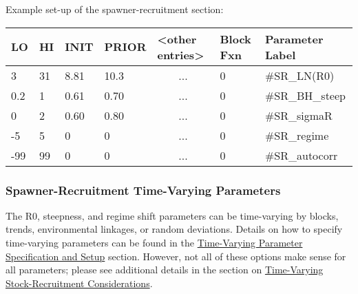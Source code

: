 Example set-up of the spawner-recruitment section:
\begin{center}
	\begin{longtable}{p{1cm} p{1cm} p{1cm}  p{1.5cm}  p{3cm}  p{2cm}  p{3.5cm}  }
		
		\hline
		LO \Tstrut & HI & INIT & PRIOR &  <other entries> & Block Fxn & Parameter Label\Bstrut\\
		\hline
		3    & 31 & 8.81 & 10.3 & \multicolumn{1}{c}{...} & 0 & \#SR\_LN(R0) \Tstrut\\
		0.2  & 1  & 0.61 & 0.70 & \multicolumn{1}{c}{...} & 0 & \#SR\_BH\_steep \\
		0    & 2  & 0.60 & 0.80 & \multicolumn{1}{c}{...} & 0 & \#SR\_sigmaR \\
		-5   & 5  & 0    & 0    & \multicolumn{1}{c}{...} & 0 & \#SR\_regime\\
		-99  & 99 & 0    & 0    & \multicolumn{1}{c}{...} & 0 & \#SR\_autocorr \Bstrut\\
		\hline
	\end{longtable}
\end{center}

\subsubsection{Spawner-Recruitment Time-Varying Parameters}

The R0, steepness, and regime shift parameters can be time-varying by blocks, trends, environmental linkages, or random deviations.  Details on how to specify time-varying parameters can be found in the \hyperlink{tvOrder}{Time-Varying Parameter Specification and Setup} section. However, not all of these options make sense for all parameters; please see additional details in the section on \hyperlink{tv-sr}{Time-Varying Stock-Recruitment Considerations}.


